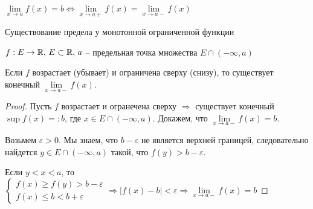\begin{notice}
    $\lim\limits_{x \to a} f(x) = b \Longleftrightarrow \lim\limits_{x \to a+} f(x) = \lim\limits_{x \to a-} f(x)$
\end{notice}

\vspace{7mm}

\begin{theorem-non}
    Существование предела у монотонной ограниченной функции

    $f : E \to \mathbb{R}, \, E \subset \mathbb{R}, \, a$ -- предельная точка множества $E \cap (-\infty, a)$

    Если $f$ возрастает (убывает) и ограничена сверху (снизу), то существует конечный $\lim\limits_{x \to a-} f(x)$.
\end{theorem-non}
\begin{proof}
    Пусть $f$ возрастает и огранечена сверху $\Rightarrow$ существует конечный $\sup f(x) =: b$, где $x \in E \cap (-\infty, a)$.
    Докажем, что $\lim\limits_{x \to a-} f(x) = b$.

    Возьмем $\varepsilon > 0$. Мы знаем, что $b - \varepsilon$ не является верхней границей, следовательно найдется $y \in E \cap (-\infty, a)$ такой, что $f(y) > b - \varepsilon$.


    Если $y < x < a$, то $\begin{cases} f(x) \geqslant f(y) > b - \varepsilon \\ f(x) \leqslant b < b + \varepsilon \end{cases} \Rightarrow |f(x) - b| < \varepsilon \Rightarrow \lim\limits_{x \to a-} f(x) = b$
\end{proof}
